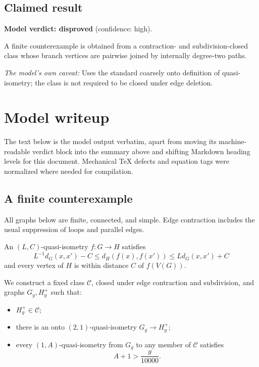 \documentclass[
  11pt,
  a4paper,
]{article}
\providecommand{\tightlist}{%
  \setlength{\itemsep}{0pt}\setlength{\parskip}{0pt}}
\begin{document}
\subsection{Claimed result}\label{claimed-result}

\textbf{Model verdict: disproved} (confidence: high).

A finite counterexample is obtained from a contraction- and
subdivision-closed class whose branch vertices are pairwise joined by
internally degree-two paths.

\emph{The model's own caveat:} Uses the standard coarsely onto
definition of quasi-isometry; the class is not required to be closed
under edge deletion.

\section{Model writeup}\label{model-writeup}

The text below is the model output verbatim, apart from moving its
machine-readable verdict block into the summary above and shifting
Markdown heading levels for this document. Mechanical TeX defects and
equation tags were normalized where needed for compilation.

\subsection{A finite counterexample}\label{a-finite-counterexample}

All graphs below are finite, connected, and simple. Edge contraction
includes the usual suppression of loops and parallel edges.

An \((L,C)\)-quasi-isometry \(f:G\to H\) satisfies \[
L^{-1}d_G(x,x')-C\le d_H(f(x),f(x'))\le Ld_G(x,x')+C
\] and every vertex of \(H\) is within distance \(C\) of \(f(V(G))\).

We construct a fixed class \(\mathcal C\), closed under edge contraction
and subdivision, and graphs \(G_g,H_g^+\) such that:

\begin{itemize}
\tightlist
\item
  \(H_g^+\in\mathcal C\);
\item
  there is an onto \((2,1)\)-quasi-isometry \(G_g\to H_g^+\);
\item
  every \((1,A)\)-quasi-isometry from \(G_g\) to any member of
  \(\mathcal C\) satisfies \[
  A+1>\frac{g}{10000}.
  \]
\end{itemize}
\end{document}
